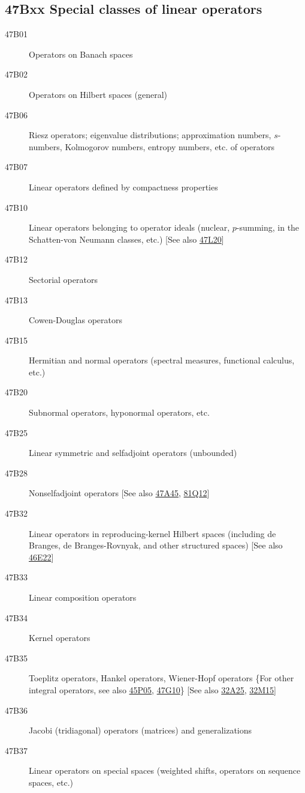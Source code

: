 \documentclass[letterpaper]{article}
\begin{document}
\subsection*{47Bxx  Special classes of linear operators }\label{47Bxx}
\begin{description}  
\item [47B01]\label{47B01} Operators on Banach spaces
\item [47B02]\label{47B02} Operators on Hilbert spaces (general)
\item [47B06]\label{47B06} Riesz operators; eigenvalue distributions; approximation numbers, $s$-numbers, Kolmogorov numbers, entropy numbers, etc. of operators
\item [47B07]\label{47B07} Linear operators defined by compactness properties
\item [47B10]\label{47B10} Linear operators belonging to operator ideals (nuclear, $p$-summing, in the Schatten-von Neumann classes, etc.) [See also \hyperref[47L20]{47L20}]
\item [47B12]\label{47B12} Sectorial operators
\item [47B13]\label{47B13} Cowen-Douglas operators
\item [47B15]\label{47B15} Hermitian and normal operators (spectral measures, functional calculus, etc.)
\item [47B20]\label{47B20} Subnormal operators, hyponormal operators, etc.
\item [47B25]\label{47B25} Linear symmetric and selfadjoint operators (unbounded)
\item [47B28]\label{47B28} Nonselfadjoint operators [See also \hyperref[47A45]{47A45}, \hyperref[81Q12]{81Q12}]
\item [47B32]\label{47B32} Linear operators in reproducing-kernel Hilbert spaces (including de Branges, de Branges-Rovnyak, and other structured spaces) [See also \hyperref[46E22]{46E22}]
\item [47B33]\label{47B33} Linear composition operators
\item [47B34]\label{47B34} Kernel operators
\item [47B35]\label{47B35} Toeplitz operators, Hankel operators, Wiener-Hopf operators \{For other integral operators, see also \hyperref[45P05]{45P05}, \hyperref[47G10]{47G10}\} [See also \hyperref[32A25]{32A25}, \hyperref[32M15]{32M15}]
\item [47B36]\label{47B36} Jacobi (tridiagonal) operators (matrices) and generalizations
\item [47B37]\label{47B37} Linear operators on special spaces (weighted shifts, operators on sequence spaces, etc.)

\end{description}
\end{document}
